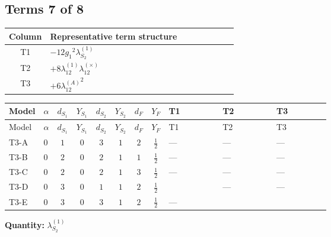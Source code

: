 \documentclass[8pt]{article}
\begin{document}
\begin{landscape}
\subsection*{Terms 7 of 8}
\begin{center}
\begin{tabular}{@{}c >{\raggedright\arraybackslash}p{0.82\linewidth}@{}}
\toprule
Column & Representative term structure \\
\midrule
T1 & \(\displaystyle -12 {g_1}^2 {\lambda_{S_2}^{(1)}}\) \\
\midrule
T2 & \(\displaystyle +8 {\lambda_{12}^{(1)}} {\lambda_{12}^{(\times)}}\) \\
\midrule
T3 & \(\displaystyle +6 {\lambda_{12}^{(A)}}^2\) \\
\midrule
\bottomrule
\end{tabular}
\end{center}
\smallskip
\tiny
\begin{longtable}{@{}llcccccc >{\raggedright\arraybackslash}p{0.21\linewidth} >{\raggedright\arraybackslash}p{0.21\linewidth} >{\raggedright\arraybackslash}p{0.21\linewidth}@{}}
\toprule
Model & $\alpha$ & $d_{S_1}$ & $Y_{S_1}$ & $d_{S_2}$ & $Y_{S_2}$ & $d_F$ & $Y_F$ & T1 & T2 & T3 \\
\midrule
\endfirsthead
\toprule
Model & $\alpha$ & $d_{S_1}$ & $Y_{S_1}$ & $d_{S_2}$ & $Y_{S_2}$ & $d_F$ & $Y_F$ & T1 & T2 & T3 \\
\midrule
\endhead
T3-A & $0$ & $1$ & $0$ & $3$ & $1$ & $2$ & $\frac{1}{2}$ & --- & --- & --- \\
\midrule
T3-B & $0$ & $2$ & $0$ & $2$ & $1$ & $1$ & $\frac{1}{2}$ & --- & --- & --- \\
\midrule
T3-C & $0$ & $2$ & $0$ & $2$ & $1$ & $3$ & $\frac{1}{2}$ & --- & --- & --- \\
\midrule
T3-D & $0$ & $3$ & $0$ & $1$ & $1$ & $2$ & $\frac{1}{2}$ & \scriptsize\adjustbox{max width=\linewidth}{$\begin{gathered} -12 {g_1}^2 {\lambda_{S_2}^{(1)}}\end{gathered}$} & --- & --- \\
\midrule
T3-E & $0$ & $3$ & $0$ & $3$ & $1$ & $2$ & $\frac{1}{2}$ & --- & \scriptsize\adjustbox{max width=\linewidth}{$\begin{gathered} +8 {\lambda_{12}^{(1)}} {\lambda_{12}^{(\times)}}\end{gathered}$} & \scriptsize\adjustbox{max width=\linewidth}{$\begin{gathered} +6 {\lambda_{12}^{(A)}}^2\end{gathered}$} \\
\midrule
\bottomrule
\end{longtable}
\clearpage
\noindent\textbf{Quantity: }$\lambda_{S_2}^{(1)}$\par\smallskip

\end{landscape}
\end{document}
